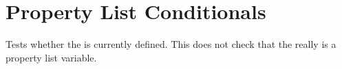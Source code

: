 \documentclass[oneside]{book}
\begin{document}


\section{Property List Conditionals}

\begin{function}{\PropIfExist}
\begin{syntax}
 
   
\end{syntax}
Tests whether the  is currently defined.  This does not
check that the  really is a property list variable.
\begin{demohigh}
\PropIfExistTF {} {}
\PropIfExistTF {} {}
\end{demohigh}
\end{function}
\end{document}
